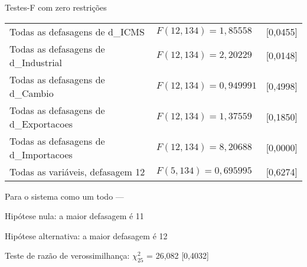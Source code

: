 \documentclass[11pt]{article}
\begin{document}
\begin{center}
Testes-F com zero restrições\\[1em]
\begin{tabular}{lll}
Todas as defasagens de d\_ICMS & $F(12, 134) = 1,85558$ & [0,0455]\\
Todas as defasagens de d\_Industrial & $F(12, 134) = 2,20229$ & [0,0148]\\
Todas as defasagens de d\_Cambio & $F(12, 134) = 0,949991$ & [0,4998]\\
Todas as defasagens de d\_Exportacoes & $F(12, 134) = 1,37559$ & [0,1850]\\
Todas as defasagens de d\_Importacoes & $F(12, 134) = 8,20688$ & [0,0000]\\
Todas as variáveis, defasagem 12 & $F(5, 134) = 0,695995$ & [0,6274]\\
\end{tabular}
\end{center}

\clearpage


\noindent Para o sistema como um todo ---\par
Hipótese nula: a maior defasagem é 11\par
Hipótese alternativa: a maior defasagem é 12\par
Teste de razão de verossimilhança: $\chi^2_{25}$ = 26,082 [0,4032]\par
\end{document}
